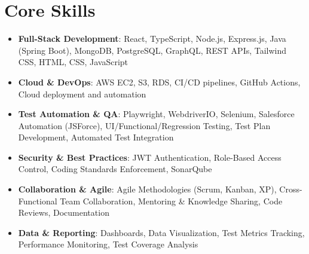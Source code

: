 \documentclass[letterpaper,10pt]{article}
\begin{document}
\section*{Core Skills}
\begin{itemize}[leftmargin=*]
    \item{\textbf{Full-Stack Development}: React, TypeScript, Node.js, Express.js, Java (Spring Boot), MongoDB, PostgreSQL, GraphQL, REST APIs, Tailwind CSS, HTML, CSS, JavaScript}
    \item{\textbf{Cloud \& DevOps}: AWS EC2, S3, RDS, CI/CD pipelines, GitHub Actions, Cloud deployment and automation}
    \item{\textbf{Test Automation \& QA}: Playwright, WebdriverIO, Selenium, Salesforce Automation (JSForce), UI/Functional/Regression Testing, Test Plan Development, Automated Test Integration}
    \item{\textbf{Security \& Best Practices}: JWT Authentication, Role-Based Access Control, Coding Standards Enforcement, SonarQube}
    \item{\textbf{Collaboration \& Agile}: Agile Methodologies (Scrum, Kanban, XP), Cross-Functional Team Collaboration, Mentoring \& Knowledge Sharing, Code Reviews, Documentation}
    \item{\textbf{Data \& Reporting}: Dashboards, Data Visualization, Test Metrics Tracking, Performance Monitoring, Test Coverage Analysis}
\end{itemize}

\newpage
\end{document}
